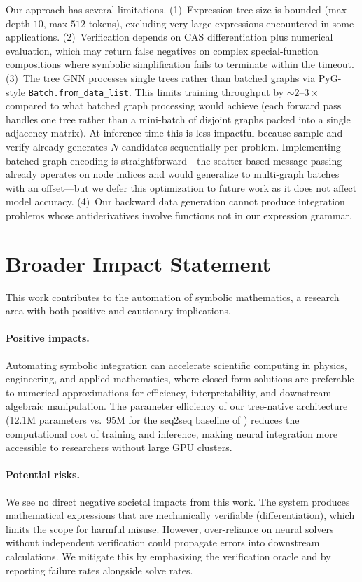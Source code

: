 \documentclass{article}
\begin{document}
Our approach has several limitations.
(1)~Expression tree size is bounded (max depth $10$, max $512$ tokens),
excluding very large expressions encountered in some applications.
(2)~Verification depends on CAS differentiation plus numerical evaluation,
which may return false negatives on complex special-function compositions
where symbolic simplification fails to terminate within the timeout.
(3)~The tree GNN processes single trees rather than batched graphs via
PyG-style \texttt{Batch.from\_data\_list}. This limits training throughput
by $\sim\!2$--$3\times$ compared to what batched graph processing would
achieve (each forward pass handles one tree rather than a mini-batch of
disjoint graphs packed into a single adjacency matrix). At inference time
this is less impactful because sample-and-verify already generates $N$
candidates sequentially per problem. Implementing batched graph encoding
is straightforward---the scatter-based message passing already operates
on node indices and would generalize to multi-graph batches with an
offset---but we defer this optimization to future work as it does not
affect model accuracy.
(4)~Our backward data generation cannot produce integration problems whose
antiderivatives involve functions not in our expression grammar.


\section*{Broader Impact Statement}

This work contributes to the automation of symbolic mathematics, a
research area with both positive and cautionary implications.

\paragraph{Positive impacts.} Automating symbolic integration can
accelerate scientific computing in physics, engineering, and applied
mathematics, where closed-form solutions are preferable to numerical
approximations for efficiency, interpretability, and downstream algebraic
manipulation. The parameter efficiency of our tree-native architecture
(12.1M parameters vs.\ 95M for the seq2seq baseline of \citet{lample2020deep}) reduces the
computational cost of training and inference, making neural integration
more accessible to researchers without large GPU clusters.

\paragraph{Potential risks.} We see no direct negative societal impacts
from this work. The system produces mathematical expressions that are
mechanically verifiable (differentiation), which limits the scope for
harmful misuse. However, over-reliance on neural solvers without
independent verification could propagate errors into downstream
calculations. We mitigate this by emphasizing the verification oracle
and by reporting failure rates alongside solve rates.
\end{document}
